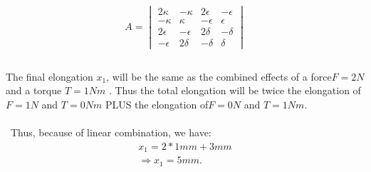 \documentclass{article}
\begin{document}
\section{}
\subsection{}
\begin{equation*}
A=
\begin{vmatrix}
2 \kappa&- \kappa&2 \epsilon&- \epsilon\\
-\kappa&\kappa&-\epsilon&\epsilon\\
2\epsilon&-\epsilon&2\delta&-\delta\\
-\epsilon&2\delta&-\delta&\delta
\end{vmatrix}
\end{equation*}
\subsection{}
	The final elongation $x_1$, will be the same as the combined effects of a force$ F=2N$ and a torque $T=1Nm$ .  Thus the total elongation will be twice the elongation of $F=1N$ and $T=0Nm$ PLUS  the elongation of$ F=0N$ and $T=1Nm$.\\\\\
Thus, because of linear combination, we have:
\begin{align*}
x_1=2*1mm+3mm\\
\Rightarrow
x_1=5mm.
\end{align*}
\end{document}
